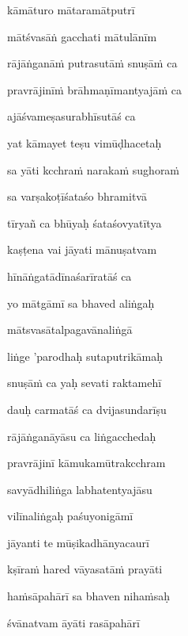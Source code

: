 \nemslokac 
kāmāturo mātaramātputrī
\dontdisplaylinenum

\nemslokad 
mātśvasāṅ gacchati mātulānīm \veg\dontdisplaylinenum

\ujvers\nemsloka 
rājāṅganā\.m putrasutā\.m snuṣā\.m ca
\dontdisplaylinenum

\nemslokab 
pravrājinī\.m brāhmaṇīmantyajā\.m ca \danda\dontdisplaylinenum 

\nemslokac 
ajāśvameṣasurabhīsutāś ca
\dontdisplaylinenum

\nemslokad 
yat kāmayet teṣu vimūḍhacetaḥ \veg\dontdisplaylinenum

\ujvers\nemsloka 
sa yāti kcchra\.m naraka\.m sughora\.m
\dontdisplaylinenum

\nemslokab 
sa varṣakoṭīśataśo bhramitvā \danda\dontdisplaylinenum

\nemslokac 
tīryañ ca bhūyaḥ śataśovyatītya
\dontdisplaylinenum

\nemslokad 
kaṣṭena vai jāyati mānuṣatvam \veg\dontdisplaylinenum

\ujvers\nemsloka 
hīnāṅgatādīnaśarīratāś ca
\dontdisplaylinenum

\nemslokab 
yo mātgāmī sa bhaved aliṅgaḥ \danda\dontdisplaylinenum

\nemslokac 
mātsvasātalpagavānaliṅgā
\dontdisplaylinenum

\nemslokad 
liṅge 'parodhaḥ sutaputrikāmaḥ \veg\dontdisplaylinenum

\ujvers\nemsloka 
snuṣā\.m ca yaḥ sevati raktamehī
\dontdisplaylinenum

\nemslokab 
dauḥ carmatāś ca dvijasundarīṣu \danda\dontdisplaylinenum

\nemslokac 
rājāṅganāyāsu ca liṅgacchedaḥ
\dontdisplaylinenum

\nemslokad 
pravrājinī kāmukamūtrakcchram \veg\dontdisplaylinenum

\ujvers\nemsloka 
savyādhiliṅga labhatentyajāsu
\dontdisplaylinenum

\nemslokab 
vilīnaliṅgaḥ paśuyonigāmī \danda\dontdisplaylinenum

\nemslokac 
jāyanti te mūṣikadhānyacaurī
\dontdisplaylinenum

\nemslokad 
kṣīra\.m hared vāyasatā\.m prayāti \veg\dontdisplaylinenum

\ujvers\nemsloka 
ha\.msāpahārī sa bhaven niha\.msaḥ
\dontdisplaylinenum

\nemslokab 
śvānatvam āyāti rasāpahārī \danda\dontdisplaylinenum

